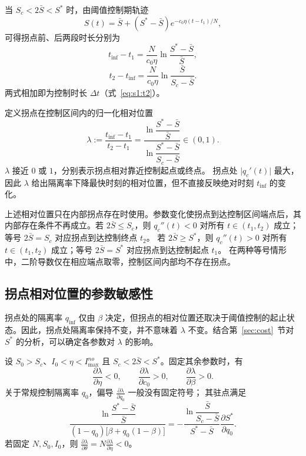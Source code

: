 \documentclass[lang=cn,a4paper,newtx]{elegantpaper}
\numberwithin{equation}{section}
\theoremstyle{plain}
\newcommand{\qinf}{q_{\mathrm{inf}}}
\begin{document}
当 $S_c<2\bar S<S^*$ 时，由阈值控制期轨迹
\[
S(t)=\bar S+(S^*-\bar S)e^{-c_0\eta(t-t_1)/N},
\]
可得拐点前、后两段时长分别为
\begin{equation}
t_{\mathrm{inf}}-t_1
=
\frac{N}{c_0\eta}
\ln\frac{S^*-\bar S}{\bar S},
\label{eq:s1:seg-high}
\end{equation}
\begin{equation}
t_2-t_{\mathrm{inf}}
=
\frac{N}{c_0\eta}
\ln\frac{\bar S}{S_c-\bar S}.
\label{eq:s1:seg-low}
\end{equation}
两式相加即为控制时长 $\Delta t$（式~\eqref{eq:s1:t2}）。

定义拐点在控制区间内的归一化相对位置
\begin{equation}
\lambda
:=
\frac{t_{\mathrm{inf}}-t_1}{t_2-t_1}
=
\frac{
\ln\dfrac{S^*-\bar S}{\bar S}
}{
\ln\dfrac{S^*-\bar S}{S_c-\bar S}
}
\in(0,1).
\label{eq:s1:lambda}
\end{equation}
$\lambda$ 接近 $0$ 或 $1$，分别表示拐点相对靠近控制起点或终点。
拐点处 $\lvert q_c'(t)\rvert$ 最大，因此 $\lambda$ 给出隔离率下降最快时刻的相对位置，但不直接反映绝对时刻 $t_{\mathrm{inf}}$ 的变化。

上述相对位置只在内部拐点存在时使用。参数变化使拐点到达控制区间端点后，其内部存在条件不再成立。若 $2\bar S\le S_c$，则 $q_c''(t)<0$ 对所有 $t\in(t_1,t_2)$ 成立；等号 $2\bar S=S_c$ 对应拐点到达控制终点 $t_2$。
若 $2\bar S\ge S^*$，则 $q_c''(t)>0$ 对所有 $t\in(t_1,t_2)$ 成立；等号 $2\bar S=S^*$ 对应拐点到达控制起点 $t_1$。
在两种等号情形中，二阶导数仅在相应端点取零，控制区间内部均不存在拐点。

\subsection{拐点相对位置的参数敏感性}
拐点处的隔离率 $\qinf$ 仅由 $\beta$ 决定，但拐点的相对位置还取决于阈值控制的起止状态。因此，拐点处隔离率保持不变，并不意味着 $\lambda$ 不变。结合第~\ref{sec:cost}~节对 $S^*$ 的分析，可以确定各参数对 $\lambda$ 的影响。

\begin{proposition}
\label{prop:s1:lambda-sensitivity}
设 $S_0>S_c$、$I_0<\eta<I_{\max}^{no}$ 且 $S_c<2\bar S<S^*$。固定其余参数时，有
\[
\frac{\partial \lambda}{\partial \eta}<0,
\qquad
\frac{\partial \lambda}{\partial c_0}>0,
\qquad
\frac{\partial \lambda}{\partial \beta}>0.
\]
关于常规控制隔离率 $q_0$，偏导 $\frac{\partial \lambda}{\partial q_0}$ 一般没有固定符号；
其驻点满足
\begin{equation}
\frac{
\ln\dfrac{S^*-\bar S}{\bar S}
}{
(1-q_0)\bigl[\beta+q_0(1-\beta)\bigr]
}
=
-
\frac{
\ln\dfrac{\bar S}{S_c-\bar S}
}{
S^*-\bar S
}
\frac{\partial S^*}{\partial q_0}.
\label{eq:s1:lambda-q0-stationary}
\end{equation}
若固定 $N,S_0,I_0$，则
$\frac{\partial \lambda}{\partial \theta}=N\frac{\partial \lambda}{\partial \eta}<0$。
\end{proposition}
\end{document}
